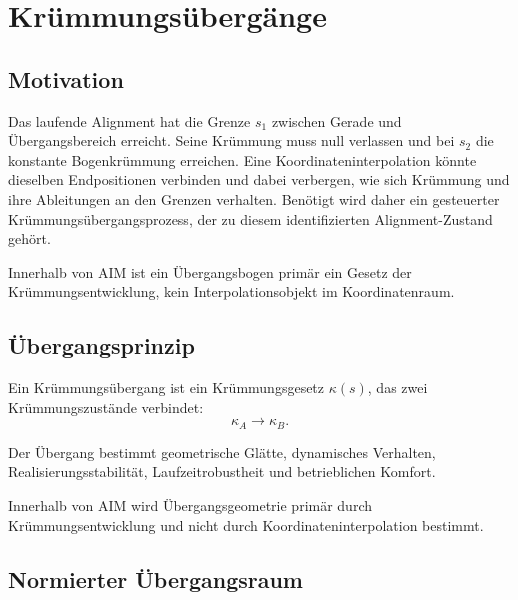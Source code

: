 
\chapter{Krümmungsübergänge}
\label{chap:curvature-transitions}

\section*{Motivation}

Das laufende Alignment hat die Grenze $s_1$ zwischen Gerade und
Übergangsbereich erreicht. Seine Krümmung muss null verlassen und bei $s_2$
die konstante Bogenkrümmung erreichen. Eine Koordinateninterpolation könnte
dieselben Endpositionen verbinden und dabei verbergen, wie sich Krümmung und
ihre Ableitungen an den Grenzen verhalten. Benötigt wird daher ein gesteuerter
Krümmungsübergangsprozess, der zu diesem identifizierten Alignment-Zustand
gehört.

\begin{principle}[Krümmungsübergangsprinzip]
\label{princ:curvature-transition}
Innerhalb von AIM ist ein Übergangsbogen primär ein Gesetz der
Krümmungsentwicklung, kein Interpolationsobjekt im Koordinatenraum.
\end{principle}

\section{Übergangsprinzip}

\begin{definition}[Krümmungsübergang]
\label{def:curvature-transition}
Ein Krümmungsübergang ist ein Krümmungsgesetz \(\kappa(s)\), das zwei
Krümmungszustände verbindet:
\[
\kappa_A\rightarrow\kappa_B.
\]
\end{definition}

Der Übergang bestimmt geometrische Glätte, dynamisches Verhalten,
Realisierungsstabilität, Laufzeitrobustheit und betrieblichen Komfort.

\begin{principle}[Übergangsprinzip]
\label{princ:transition-principle}
Innerhalb von AIM wird Übergangsgeometrie primär durch
Krümmungsentwicklung und nicht durch Koordinateninterpolation bestimmt.
\end{principle}

\section{Normierter Übergangsraum}

